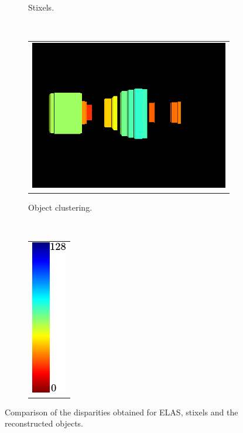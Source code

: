 \begin{figure}[h!]
\begin{subfigure}[b]{0.25\textwidth}
	  \caption{Stixels.}
        \end{subfigure}%
        ~
        \begin{subfigure}[b]{0.25\textwidth}
	  \begin{tabular}{c}
	    \includegraphics[width=\textwidth]{objects}\label{fig:cp04_reconstruction_objects}
	  \end{tabular}
	  \caption{Object clustering.}
        \end{subfigure}%
        ~
        \begin{subfigure}[b]{0.25\textwidth}
	  \centering
	  \begin{tabular}{c}
	    \includegraphics[height=0.375\figuresheight]{colorscale_jet}\label{fig:cp04_reconstruction_colorscale}\\
	  \end{tabular}
	  \caption*{}
        \end{subfigure}%
        \caption{Comparison of the disparities obtained for \ac{ELAS}, stixels and the reconstructed objects.}\label{fig:cp04_reconstruction}
\end{figure}

